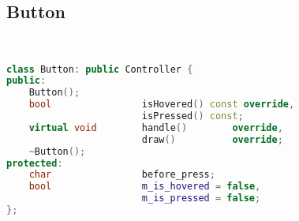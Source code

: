 \subsection{Button}
\begin{lstlisting}[language=C++]


class Button: public Controller {
public:
    Button();
    bool                isHovered() const override,
                        isPressed() const;
    virtual void        handle()        override,
                        draw()          override;
    ~Button();
protected:
    char                before_press;
    bool                m_is_hovered = false,
                        m_is_pressed = false;
};






\end{lstlisting}

